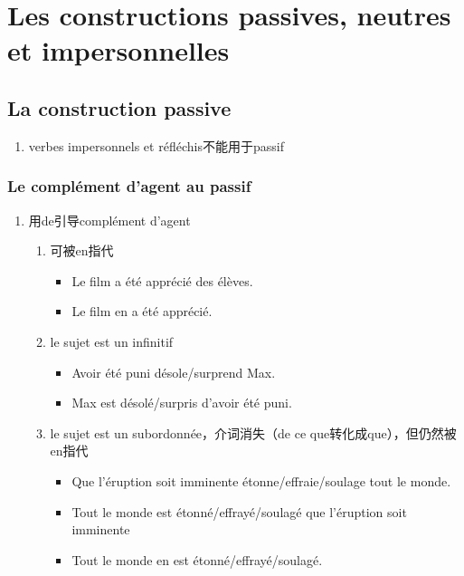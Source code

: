 \documentclass[UTF8]{report}
\begin{document}
\section{Les constructions passives, neutres et impersonnelles}
\subsection{La construction passive}
\begin{enumerate}
    \item verbes impersonnels et réfléchis不能用于passif
\end{enumerate}
\subsubsection{Le complément d’agent au passif}
\begin{enumerate}
    \item 用de引导complément d’agent
    \begin{enumerate}
        \item 可被en指代
        \begin{itemize}
            \item Le film a été apprécié des élèves.
            \item Le film en a été apprécié.
        \end{itemize}
        \item le sujet est un infinitif
        \begin{itemize}
            \item Avoir été puni désole/surprend Max.
            \item Max est désolé/surpris d’avoir été puni.
        \end{itemize}
        \item le sujet est un subordonnée，介词消失（de ce que转化成que），但仍然被en指代
        \begin{itemize}
            \item Que l’éruption soit imminente étonne/effraie/soulage tout le monde.
            \item Tout le monde est étonné/effrayé/soulagé que l’éruption soit imminente
            \item Tout le monde en est étonné/effrayé/soulagé.
        \end{itemize}
        \begin{table}[H]
    \centering


\end{table}
\end{enumerate}
\end{enumerate}
\end{document}
